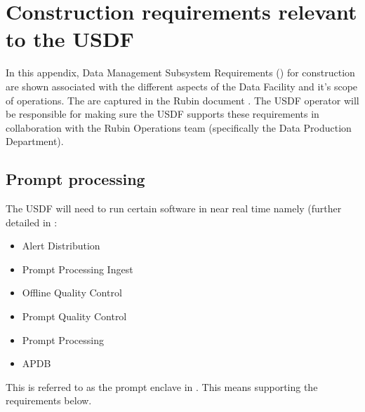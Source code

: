 \section{Construction requirements relevant to the USDF}\label{sec:dmsrreqs}

In this appendix, Data Management Subsystem Requirements (\DMSR) for construction are
shown associated with the different aspects of the Data Facility and it's
scope of operations. The \DMSR are captured in the Rubin document . The \gls{USDF} operator will be responsible for making sure the \gls{USDF} supports these requirements in collaboration with the Rubin Operations team (specifically the Data Production Department).

\subsection{Prompt processing} \label{sec:prompproc}
The USDF will need to run certain software in near real time namely (further detailed in :

\begin{itemize}
\item Alert Distribution
\item Prompt Processing Ingest
\item Offline Quality Control
\item Prompt Quality Control
\item Prompt Processing
\item \gls{APDB}
\end{itemize}
This is referred to as the prompt enclave in .
This means supporting the \DMSR requirements below.

